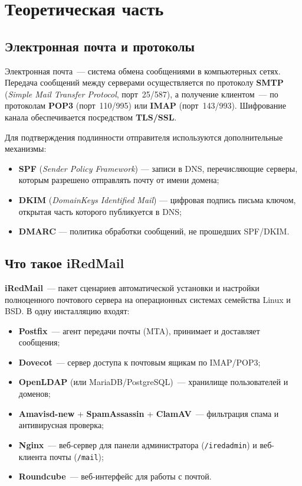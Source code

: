 \chapter{Теоретическая часть}
\label{ch:theory}

\section{Электронная почта и протоколы}

Электронная почта~— система обмена сообщениями в компьютерных сетях.
Передача сообщений между серверами осуществляется по протоколу
\textbf{SMTP} (\textit{Simple Mail Transfer Protocol}, порт~25/587),
а получение клиентом~— по протоколам \textbf{POP3} (порт~110/995)
или \textbf{IMAP} (порт~143/993). Шифрование канала обеспечивается
посредством \textbf{TLS/SSL}.

Для подтверждения подлинности отправителя используются дополнительные механизмы:
\begin{itemize}
  \item \textbf{SPF} (\textit{Sender Policy Framework}) — записи в DNS,
        перечисляющие серверы, которым разрешено отправлять почту от имени домена;
  \item \textbf{DKIM} (\textit{DomainKeys Identified Mail}) — цифровая подпись
        письма ключом, открытая часть которого публикуется в DNS;
  \item \textbf{DMARC} — политика обработки сообщений, не прошедших SPF/DKIM.
\end{itemize}

\section{Что такое iRedMail}

\textbf{iRedMail}~— пакет сценариев автоматической установки и настройки
полноценного почтового сервера на операционных системах семейства Linux и BSD.
В одну инсталляцию входят:
\begin{itemize}
  \item \textbf{Postfix}~— агент передачи почты (MTA), принимает и
        доставляет сообщения;
  \item \textbf{Dovecot}~— сервер доступа к почтовым ящикам по IMAP/POP3;
  \item \textbf{OpenLDAP} (или MariaDB/PostgreSQL)~— хранилище пользователей
        и доменов;
  \item \textbf{Amavisd-new} + \textbf{SpamAssassin} + \textbf{ClamAV}~—
        фильтрация спама и антивирусная проверка;
  \item \textbf{Nginx}~— веб-сервер для панели администратора
        (\texttt{/iredadmin}) и веб-клиента почты (\texttt{/mail});
  \item \textbf{Roundcube}~— веб-интерфейс для работы с почтой.
\end{itemize}


